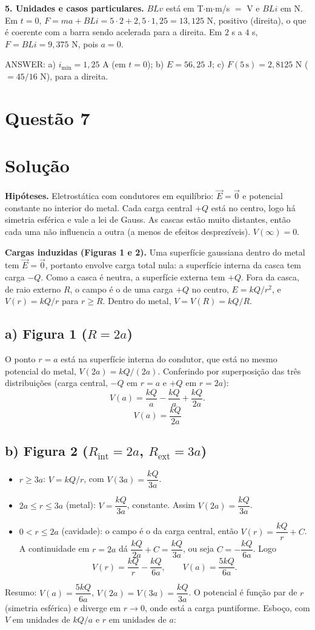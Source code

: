 \documentclass{article}%
\begin{document}
\textbf{5. Unidades e casos particulares.} $BLv$ está em T$\cdot$m$\cdot$m/s $=$ V e $BLi$ em N. Em $t=0$, $F=ma+BLi=5\cdot 2+2{,}5\cdot 1{,}25=13{,}125$ N, positivo (direita), o que é coerente com a barra sendo acelerada para a direita. Em $2$ s a $4$ s, $F=BLi=9{,}375$ N, pois $a=0$.

ANSWER: a) $i_{\min}=1{,}25$ A (em $t=0$); b) $E=56{,}25$ J; c) $F(5\,\text{s})=2{,}8125$ N ($=45/16$ N), para a direita.%
\newpage%
\section*{Questão 7}

\section*{Solução}

\textbf{Hipóteses.} Eletrostática com condutores em equilíbrio: $\vec E=\vec 0$ e potencial constante no interior do metal. Cada carga central $+Q$ está no centro, logo há simetria esférica e vale a lei de Gauss. As cascas estão muito distantes, então cada uma não influencia a outra (a menos de efeitos desprezíveis). $V(\infty)=0$.

\textbf{Cargas induzidas (Figuras 1 e 2).} Uma superfície gaussiana dentro do metal tem $\vec E=\vec 0$, portanto envolve carga total nula: a superfície interna da casca tem carga $-Q$. Como a casca é neutra, a superfície externa tem $+Q$. Fora da casca, de raio externo $R$, o campo é o de uma carga $+Q$ no centro, $E=kQ/r^2$, e $V(r)=kQ/r$ para $r\ge R$. Dentro do metal, $V=V(R)=kQ/R$.

\subsection*{a) Figura 1 ($R=2a$)}
O ponto $r=a$ está na superfície interna do condutor, que está no mesmo potencial do metal, $V(2a)=kQ/(2a)$. Conferindo por superposição das três distribuições (carga central, $-Q$ em $r=a$ e $+Q$ em $r=2a$):
\[
V(a)=\frac{kQ}{a}-\frac{kQ}{a}+\frac{kQ}{2a}.
\]
\[
\boxed{V(a)=\dfrac{kQ}{2a}}
\]

\subsection*{b) Figura 2 ($R_{\text{int}}=2a$, $R_{\text{ext}}=3a$)}
\begin{itemize}
\item $r\ge 3a$: $V=kQ/r$, com $V(3a)=\dfrac{kQ}{3a}$.
\item $2a\le r\le 3a$ (metal): $V=\dfrac{kQ}{3a}$, constante. Assim $V(2a)=\dfrac{kQ}{3a}$.
\item $0<r\le 2a$ (cavidade): o campo é o da carga central, então $V(r)=\dfrac{kQ}{r}+C$. A continuidade em $r=2a$ dá $\dfrac{kQ}{2a}+C=\dfrac{kQ}{3a}$, ou seja $C=-\dfrac{kQ}{6a}$. Logo
\[
V(r)=\frac{kQ}{r}-\frac{kQ}{6a},\qquad V(a)=\frac{5kQ}{6a}.
\]
\end{itemize}
Resumo: $V(a)=\dfrac{5kQ}{6a}$, $V(2a)=V(3a)=\dfrac{kQ}{3a}$. O potencial é função par de $r$ (simetria esférica) e diverge em $r\to0$, onde está a carga puntiforme. Esboço, com $V$ em unidades de $kQ/a$ e $r$ em unidades de $a$:
\end{document}
